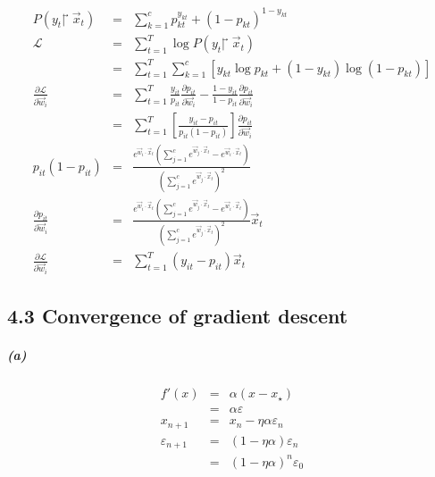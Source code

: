 \documentclass{article}
\begin{document}
\begin{eqnarray*}
	P(y_t|⃗\vec{x}_t) &=& \sum_{k=1}^{c}p_{kt}^{y_{kt}} + (1-p_{kt})^{1-y_{kt}}\\
	\mathcal{L} &=& \sum_{t=1}^{T}\log P(y_t|⃗\vec{x}_t) \\
	&=&\sum_{t=1}^{T}\sum_{k=1}^{c}[y_{kt}\log p_{kt} + (1-y_{kt})\log (1-p_{kt})]\\
	\frac{\partial \mathcal{L}}{\partial \vec{w}_i} &=&
	\sum_{t=1}^{T} \frac{y_{it}}{p_{it}} \frac{\partial p_{it}}{\partial \vec{w}_i} - \frac{1-y_{it}}{1-p_{it}} \frac{\partial p_{it}}{\partial \vec{w}_i}\\
	&=&\sum_{t=1}^{T} \left[\frac{y_{it} - p_{it}}{p_{it}(1-p_{it})}\right]\frac{\partial p_{it}}{\partial \vec{w}_i}\\
	p_{it}(1-p_{it}) &=& \frac{e^{\vec{w}_i \cdot \vec{x}_t}(\sum_{j=1}^{c}e^{\vec{w}_j \cdot \vec{x}_t} - e^{\vec{w}_i \cdot \vec{x}_t})}{(\sum_{j=1}^{c}e^{\vec{w}_j \cdot \vec{x}_t})^2}\\
	\frac{\partial p_{it}}{\partial \vec{w}_i} &=& \frac{e^{\vec{w}_i \cdot \vec{x}_t}(\sum_{j=1}^{c}e^{\vec{w}_j \cdot \vec{x}_t} - e^{\vec{w}_i \cdot \vec{x}_t})}{(\sum_{j=1}^{c}e^{\vec{w}_j \cdot \vec{x}_t})^2} \vec{x}_t\\
	\frac{\partial \mathcal{L}}{\partial \vec{w}_i} &=&\sum_{t=1}^{T}(y_{it} - p_{it})\vec{x}_{t}
\end{eqnarray*}

\subsection*{4.3 Convergence of gradient descent}
\subparagraph*{(a)}
\begin{eqnarray*}
	f'(x) &=& \alpha (x-x_{\star})\\
	&=& \alpha \varepsilon\\
	x_{n+1} &=& x_n - \eta \alpha \varepsilon_n\\
	\varepsilon_{n+1} &=& (1-\eta\alpha)\varepsilon_n\\
	&=& (1-\eta\alpha)^n \varepsilon_0\\	
\end{eqnarray*}
\end{document}
